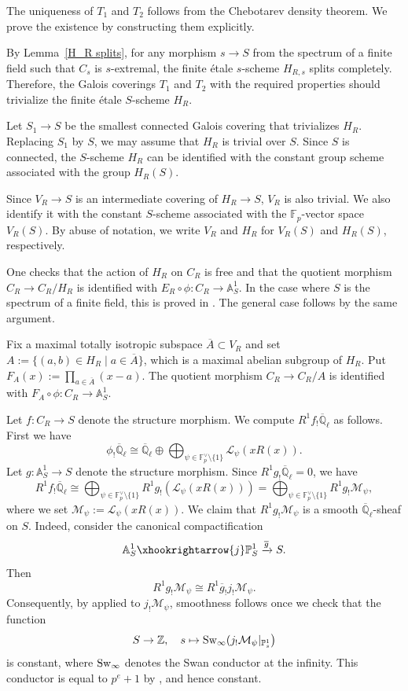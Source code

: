 \documentclass[12pt,a4paper]{amsart}
\theoremstyle{definition}
\def\A{{\mathbb A}}
\def\F{{\mathbb F}}
\def\Z{{\mathbb Z}}
\def\Ql{\overline{\mathbb{Q}}_\ell}
\theoremstyle{remark}
\begin{document}
{The uniqueness of $T_1$ and $T_2$ follows from the Chebotarev density theorem. We prove the existence by constructing them explicitly. 

\medskip 

\noindent
By Lemma~\ref{H_R splits}, for any morphism $s\to S$ from the spectrum of a finite field such that $C_s$ is $s$-extremal, the finite \'etale $s$-scheme $H_{R,s}$ splits completely. 
Therefore, the Galois coverings $T_1$ and $T_2$ with the required properties should trivialize the finite \'etale $S$-scheme $H_R$. 

Let $S_1\to S$ be the 
smallest connected Galois covering that trivializes $H_R$. Replacing $S_1$ by $S$, we may assume that $H_R$ is trivial over $S$. 
Since $S$ is connected, the $S$-scheme $H_{R}$ can be identified with the constant group scheme associated with the group  $H_R(S)$. 

Since $V_R\to S$ is an intermediate covering of $H_R\to S$, $V_R$ is also trivial. We also identify it with the constant $S$-scheme associated with the $\F_p$-vector space $V_R(S)$. By abuse of notation, 
we write $V_R$ and $H_R$ for $V_R(S)$ and $H_R(S)$, respectively. 

\medskip 

One checks that the action of $H_R$ on $C_R$ is free and that the quotient morphism $C_{R}\to C_{R}/H_R$ is identified with  $E_R\circ\phi\colon C_{R}\to\A^1_{S}$. In the case where $S$ is the spectrum of a finite field, this is proved in \cite[Lemma~2.7]{TT}. The general case follows by the same argument. 


Fix a maximal totally isotropic subspace $\overline{A}\subset V_R$ and set $A:=\{(a,b)\in H_R\mid a\in \overline{A}\}$, which is a maximal abelian subgroup of $H_R$. Put $F_A(x):=\prod_{a\in \overline{A}}(x-a)$. The quotient morphism $C_{R}\to C_{R}/A$ is identified with $F_{A}\circ\phi\colon C_{R}\to \A^1_{S}$. 


Let $f\colon C_{R}\to S$ denote the structure morphism. We compute $R^1f_!\Ql$ as follows. First we have 
\[\phi_!\Ql\cong \Ql\oplus\bigoplus_{\psi\in\F_p^\vee\setminus\{1\}}{\mathcal L}_{\psi}(xR(x)). \]
Let $g\colon \A^1_{S}\to S$ denote the structure morphism. Since 
$R^1 g_! \Ql=0$, we have 
\[R^1f_!\Ql\cong \bigoplus_{\psi\in\F_p^\vee\setminus\{1\}}R^1g_!({\mathcal L}_{\psi}(xR(x)))=\bigoplus_{\psi\in\F_p^\vee\setminus\{1\}}R^1g_!\mathcal{M}_\psi, \]
where we set $\mathcal{M}_\psi:={\mathcal L}_{\psi}(xR(x))$. 
We claim that $R^1g_!\mathcal{M}_\psi$ is a smooth $\Ql$-sheaf on $S$. Indeed, consider the canonical compactification 
\[
\A^1_S\xhookrightarrow{j}\mathbb{P}^1_S\xrightarrow{\overline{g}}S. 
\]
Then 
\[
R^1g_!\mathcal{M}_\psi\cong R^1\overline{g}_!j_!\mathcal{M}_\psi.
\]
Consequently, by \cite[Corollaire~2.1.2]{Lau} applied to $j_!\mathcal{M}_\psi$, smoothness follows once we check that the function 
\[
S\to\Z,\quad s\mapsto {\rm Sw}_\infty(j_!\mathcal{M}_\psi|_{\mathbb{P}^1_s}\bigr)
\]
is constant, where ${\rm Sw}_\infty$ denotes the Swan conductor at the infinity. This conductor is equal to $p^{e}+1$ by \cite[Lemma~3.3]{TT}, and hence constant. 

}
\end{document}
